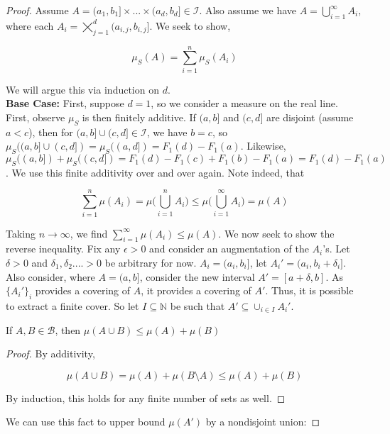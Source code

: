 \begin{proof}
   Assume $A = (a_1,b_1] \times ... \times (a_d,b_d] \in \mathcal I$. Also 
   assume we have $A = \bigcup_{i=1}^\infty A_i$, where each 
   $A_i = \bigtimes_{j=1}^d (a_{i,j}, b_{i,j}]$. We seek to show, 

   \[ \mu_S(A) = \sum_{i=1}^n \mu_S(A_i) \]

   We will argue this via induction on $d$. \\ 
   
   \textbf{Base Case:} First, suppose $d=1$, so we consider 
   a measure on the real line. First, observe $\mu_S$ is then finitely additive. If 
   $(a,b]$ and $(c,d]$ are disjoint (assume $a < c$), then for $(a,b] \cup (c,d] \in \mathcal I$, we have 
   $b = c$, so $\mu_S((a,b] \cup (c,d]) = \mu_S((a,d]) = F_1(d) - F_1(a)$. Likewise, 
   $\mu_S((a,b]) + \mu_S((c,d]) = F_1(d) - F_1(c) + F_1(b) - F_1(a) = F_1(d) - F_1(a)$. 
   We use this finite additivity over and over again. Note indeed, that 

   \[ \sum_{i=1}^n \mu(A_i) = \mu\bigg(\bigcup_{i=1}^n A_i\bigg) \leq \mu\bigg(\bigcup_{i=1}^\infty A_i\bigg) = \mu(A) \]
   
   Taking $n \to \infty$, we find $\sum_{i=1}^\infty \mu(A_i) \leq \mu(A)$. We now seek to show 
   the reverse inequality. Fix any
   $\epsilon > 0$ and consider an augmentation of the $A_i$'s. Let 
   $\delta > 0$ and $\delta_1,\delta_2.... > 0$ be arbitrary for now.
   $A_i = (a_i, b_i]$, let $A_i' = (a_i, b_i + \delta_i]$. Also consider, 
   where $A = (a,b]$, consider the new interval $A' = [a+\delta, b]$. As 
   $\{A_i'\}_i$ provides a covering of $A$, it provides a covering of
   $A'$. Thus, it is possible to extract a finite cover. So let $I \subseteq \mathbb N$ be such that 
   $A' \subseteq \cup_{i \in I}A_i'$. 

   \begin{Proposition}
      If $A, B \in \mathcal B$, then $\mu(A \cup B) \leq \mu(A) + \mu(B)$
   \end{Proposition}

   \begin{proof}
      By additivity, 

      \[ \mu(A \cup B) = \mu(A) + \mu(B \setminus A) \leq \mu(A) + \mu(B)  \]

      By induction, this holds for any finite number of sets as well.
   \end{proof}
   
   We can use this fact to upper bound $\mu(A')$ by a nondisjoint union:


\end{proof}

